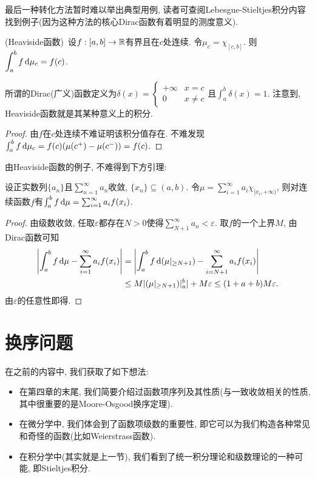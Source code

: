 最后一种转化方法暂时难以举出典型用例, 读者可查阅Lebesgue-Stieltjes积分内容找到例子(因为这种方法的核心Dirac函数有着明显的测度意义). 

\begin{example}
	(Heaviside函数)~设$f:[a,b] \to \mathbb{R}$有界且在$c$处连续. 令$\mu _c=\chi _{[c,b]}$. 则$\displaystyle \int_a^b f \mathop{}\!\mathrm{d} \mu _c = f(c)$. 
\end{example}
\begin{remark}
	所谓的Dirac(广义)函数定义为$\delta (x) = \begin{cases}
		+\infty & x=c \\ 0 & x \neq c
	\end{cases}$且$\int_a^b \delta (x) =1$. 注意到, Heaviside函数就是其某种意义上的积分. 
\end{remark}
\begin{proof}
	由$f$在$c$处连续不难证明该积分值存在. 不难发现$\int_a^b f \mathop{}\!\mathrm{d} \mu _c = f(c)(\mu (c^+)- \mu (c^-)) = f(c)$. 
\end{proof}






由Heaviside函数的例子, 不难得到下方引理: 

\begin{lemma}{}
	设正实数列$\{ a_n \}$且$\sum_{n=1}^{\infty} a_n$收敛, $\{ x_n \}\subseteq (a,b)$. 令$\mu = \sum_{i=1}^{\infty} a_i\chi _{[x_i,+\infty)}$, 则对连续函数$f$有$\int_a^b f \mathop{}\!\mathrm{d} \mu = \sum_{i=1}^{\infty} a_if(x_i)$. 
\end{lemma}
\begin{proof}
	由级数收敛, 任取$\varepsilon$都存在$N>0$使得$\sum_{N+1}^{\infty} a_n <\varepsilon$. 取$f$的一个上界$M$, 由Dirac函数可知
	\begin{align*}
		\left| \int_a^b f \mathop{}\!\mathrm{d} \mu - \sum_{i=1}^{\infty} a_if(x_i) \right| &= \left| \int_a^b f \mathop{}\!\mathrm{d} (\mu|_{\geq N+1}) - \sum_{i=N+1}^{\infty} a_if(x_i) \right| \\
		&\leq M|(\mu|_{\geq N+1})|_a^b| + M\varepsilon \leq (1+a+b)M\varepsilon .
	\end{align*}
	由$\varepsilon$的任意性即得. 
\end{proof}



\newpage
\section{换序问题}

在之前的内容中, 我们获取了如下想法: 

\begin{itemize}
	\item 在第四章的末尾, 我们简要介绍过函数项序列及其性质(与一致收敛相关的性质, 其中很重要的是Moore-Osgood换序定理). 
	\item 在微分学中, 我们体会到了函数项级数的重要性, 即它可以为我们构造各种常见和奇怪的函数(比如Weierstrass函数). 
	\item 在积分学中(其实就是上一节), 我们看到了统一积分理论和级数理论的一种可能, 即Stieltjes积分. 
\end{itemize}

